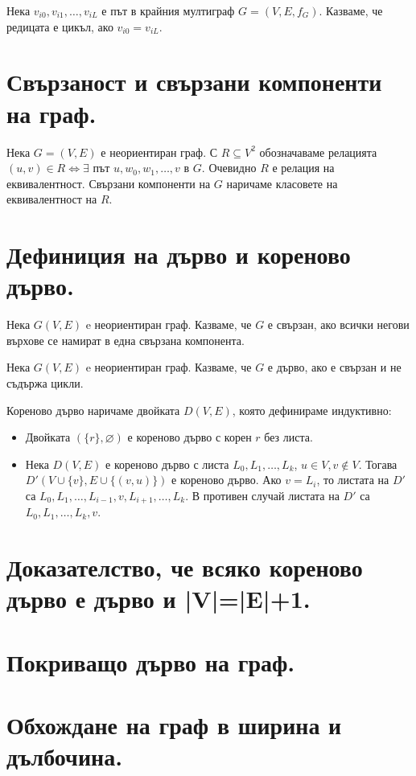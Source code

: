 \documentclass[fleqn,12pt]{article}
\begin{document}
\begin{flushleft}
Нека $v_{i0}, v_{i1}, \dots, v_{iL}$ е път в крайния мултиграф $G = (V, E, f_G)$.
Казваме, че редицата е цикъл, ако $v_{i0} = v_{iL}$.

\section{Свързаност и свързани компоненти на граф.} 

Нека $G = (V, E)$ е неориентиран граф. 
С $R \subseteq V^2$ обозначаваме релацията $ (u, v) \in R \Leftrightarrow \exists $ път $u, w_0, w_1, \dots, v$ в $G$.
Очевидно $R$ е релация на еквивалентност. Свързани компоненти на $G$ наричаме класовете на еквивалентност на $R$.

\section{Дефиниция на дърво и кореново дърво.}

Нека $G(V, E)$ e неориентиран граф. Казваме, че $G$ е свързан, ако всички негови върхове
се намират в една свързана компонента.
\vspace{10mm}

Нека $G(V, E)$ e неориентиран граф. Казваме, че $G$ е дърво, ако е свързан и не съдържа цикли.
\vspace{10mm}

Кореново дърво наричаме двойката $D(V, E)$, която дефинираме индуктивно:
\begin{itemize}
	\item Двойката $(\{r\}, \varnothing)$ е кореново дърво с корен $r$ без листа.
	\item Нека $D(V,E)$ е кореново дърво с листа $L_0, L_1, \dots, L_k$, $u \in V, v \notin V$. Тогава $D'(V \cup \{v\}, E \cup \{ (v, u)\})$ е кореново дърво.
	Ако $v = L_i$, то листата на $D'$ са $L_0, L_1, \dots, L_{i-1}, v, L_{i+1}, \dots, L_k$. В противен случай листата на $D'$ са 
	$L_0, L_1, \dots, L_k, v$.
\end{itemize}


\section{Доказателство, че всяко кореново дърво е дърво и |V|=|E|+1.}
\section{Покриващо дърво на граф.}
\section{Обхождане на граф в ширина и дълбочина.}

\end{flushleft}
\end{document}
